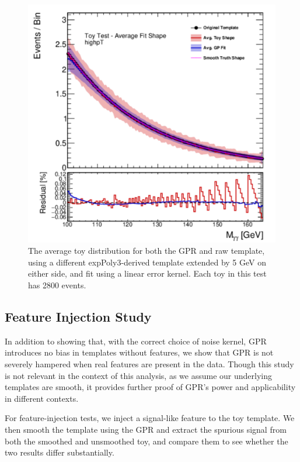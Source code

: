 \begin{figure} 
\begin{center}
  \includegraphics[width=\textwidth]{figures/background/gpr/validation/linear/ToyTest_AvgFitShape_highpT_2800_noSig}   
\caption{The average toy distribution for both the GPR and raw template, using a different expPoly3-derived template extended by 5 GeV on either side, and fit using a linear error kernel. Each toy in this test has 2800 events.}
\label{fig:linearkernel_highpt_2800_noSig}
\end{center}
\end{figure}

\clearpage


\subsection{Feature Injection Study}

In addition to showing that, with the correct choice of noise kernel, GPR introduces no bias in templates without features, we show that GPR is not severely hampered when real features are present in the data. Though this study is not relevant in the context of this analysis, as we assume our underlying templates are smooth, it provides further proof of GPR's power and applicability in different contexts.


For feature-injection tests, we inject a signal-like feature to the toy template. We then smooth the template using the GPR and extract the spurious signal from both the smoothed and unsmoothed toy, and compare them to see whether the two results differ substantially.


